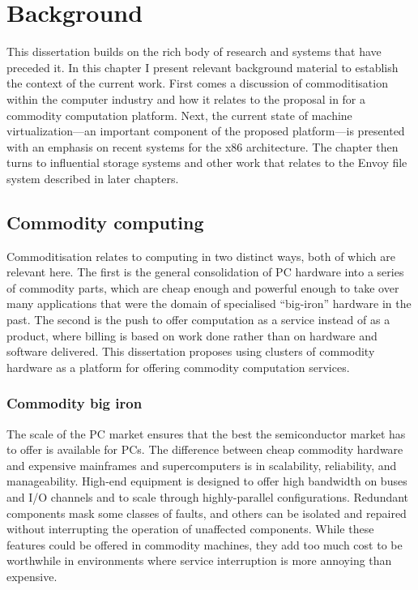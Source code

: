 \chapter{Background}\label{cha:background}

This dissertation builds on the rich body of research and systems that have preceded it. In this chapter I present relevant background material to establish the context of the current work. First comes a discussion of commoditisation within the computer industry and how it relates to the proposal in  for a commodity computation platform. Next, the current state of machine virtualization---an important component of the proposed platform---is presented with an emphasis on recent systems for the x86 architecture. The chapter then turns to influential storage systems and other work that relates to the Envoy file system described in later chapters.

\section{Commodity computing}

Commoditisation relates to computing in two distinct ways, both of which are relevant here. The first is the general consolidation of PC hardware into a series of commodity parts, which are cheap enough and powerful enough to take over many applications that were the domain of specialised ``big-iron'' hardware in the past. The second is the push to offer computation as a service instead of as a product, where billing is based on work done rather than on hardware and software delivered. This dissertation proposes using clusters of commodity hardware as a platform for offering commodity computation services.

\subsection{Commodity big iron}

The scale of the PC market ensures that the best the semiconductor market has to offer is available for PCs. The difference between cheap commodity hardware and expensive mainframes and supercomputers is in scalability, reliability, and manageability. High-end equipment is designed to offer high bandwidth on buses and I/O channels and to scale through highly-parallel configurations. Redundant components mask some classes of faults, and others can be isolated and repaired without interrupting the operation of unaffected components. While these features could be offered in commodity machines, they add too much cost to be worthwhile in environments where service interruption is more annoying than expensive.

